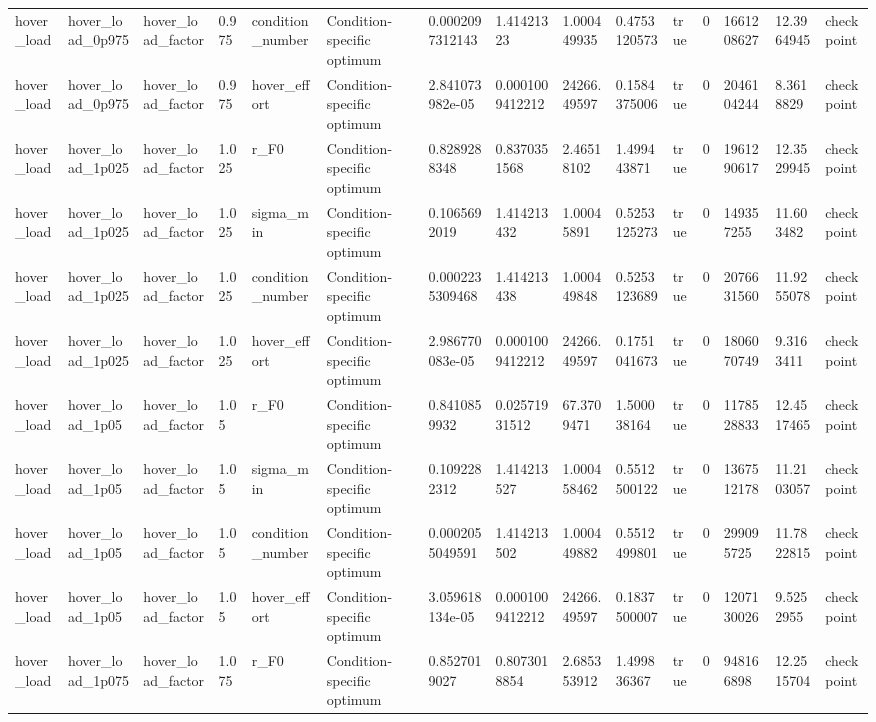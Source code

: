 \begin{tabular}{@{}lllllllllllllll@{}}
hover\_load & hover\_load\_0p975 & hover\_load\_factor & 0.975 & condition\_number & Condition-specific optimum & 0.0002097312143 & 1.41421323 & 1.000449935 & 0.4753120573 & true & 0 & 1661208627 & 12.3964945 & checkpoint \\
hover\_load & hover\_load\_0p975 & hover\_load\_factor & 0.975 & hover\_effort & Condition-specific optimum & 2.841073982e-05 & 0.0001009412212 & 24266.49597 & 0.1584375006 & true & 0 & 2046104244 & 8.3618829 & checkpoint \\
hover\_load & hover\_load\_1p025 & hover\_load\_factor & 1.025 & r\_F0 & Condition-specific optimum & 0.8289288348 & 0.8370351568 & 2.46518102 & 1.499443871 & true & 0 & 1961290617 & 12.3529945 & checkpoint \\
hover\_load & hover\_load\_1p025 & hover\_load\_factor & 1.025 & sigma\_min & Condition-specific optimum & 0.1065692019 & 1.414213432 & 1.00045891 & 0.5253125273 & true & 0 & 149357255 & 11.603482 & checkpoint \\
hover\_load & hover\_load\_1p025 & hover\_load\_factor & 1.025 & condition\_number & Condition-specific optimum & 0.0002235309468 & 1.414213438 & 1.000449848 & 0.5253123689 & true & 0 & 2076631560 & 11.9255078 & checkpoint \\
hover\_load & hover\_load\_1p025 & hover\_load\_factor & 1.025 & hover\_effort & Condition-specific optimum & 2.986770083e-05 & 0.0001009412212 & 24266.49597 & 0.1751041673 & true & 0 & 1806070749 & 9.3163411 & checkpoint \\
hover\_load & hover\_load\_1p05 & hover\_load\_factor & 1.05 & r\_F0 & Condition-specific optimum & 0.8410859932 & 0.02571931512 & 67.3709471 & 1.500038164 & true & 0 & 1178528833 & 12.4517465 & checkpoint \\
hover\_load & hover\_load\_1p05 & hover\_load\_factor & 1.05 & sigma\_min & Condition-specific optimum & 0.1092282312 & 1.414213527 & 1.000458462 & 0.5512500122 & true & 0 & 1367512178 & 11.2103057 & checkpoint \\
hover\_load & hover\_load\_1p05 & hover\_load\_factor & 1.05 & condition\_number & Condition-specific optimum & 0.0002055049591 & 1.414213502 & 1.000449882 & 0.5512499801 & true & 0 & 299095725 & 11.7822815 & checkpoint \\
hover\_load & hover\_load\_1p05 & hover\_load\_factor & 1.05 & hover\_effort & Condition-specific optimum & 3.059618134e-05 & 0.0001009412212 & 24266.49597 & 0.1837500007 & true & 0 & 1207130026 & 9.5252955 & checkpoint \\
hover\_load & hover\_load\_1p075 & hover\_load\_factor & 1.075 & r\_F0 & Condition-specific optimum & 0.8527019027 & 0.8073018854 & 2.685353912 & 1.499836367 & true & 0 & 948166898 & 12.2515704 & checkpoint \\

\end{tabular}
